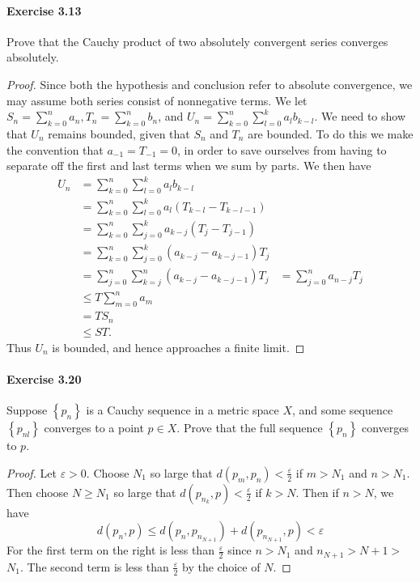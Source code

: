 \documentclass{article}
\theoremstyle{definition}
\begin{document}
\paragraph{Exercise 3.13} Prove that the Cauchy product of two absolutely convergent series converges absolutely.
\begin{proof}
    Since both the hypothesis and conclusion refer to absolute convergence, we may assume both series consist of nonnegative terms. We let $S_n=\sum_{k=0}^n a_n, T_n=\sum_{k=0}^n b_n$, and $U_n=\sum_{k=0}^n \sum_{l=0}^k a_l b_{k-l}$. We need to show that $U_n$ remains bounded, given that $S_n$ and $T_n$ are bounded. To do this we make the convention that $a_{-1}=T_{-1}=0$, in order to save ourselves from having to separate off the first and last terms when we sum by parts. We then have
$$
\begin{aligned}
U_n &=\sum_{k=0}^n \sum_{l=0}^k a_l b_{k-l} \\
&=\sum_{k=0}^n \sum_{l=0}^k a_l\left(T_{k-l}-T_{k-l-1}\right) \\
&=\sum_{k=0}^n \sum_{j=0}^k a_{k-j}\left(T_j-T_{j-1}\right) \\
&=\sum_{k=0}^n \sum_{j=0}^k\left(a_{k-j}-a_{k-j-1}\right) T_j \\
&=\sum_{j=0}^n \sum_{k=j}^n\left(a_{k-j}-a_{k-j-1}\right) T_j
&=\sum_{j=0}^n a_{n-j} T_j \\
&\leq T \sum_{m=0}^n a_m \\
&=T S_n \\
&\leq S T .
\end{aligned}
$$
Thus $U_n$ is bounded, and hence approaches a finite limit.

\end{proof}


\paragraph{Exercise 3.20} Suppose $\left\{p_{n}\right\}$ is a Cauchy sequence in a metric space $X$, and some sequence $\left\{p_{n l}\right\}$ converges to a point $p \in X$. Prove that the full sequence $\left\{p_{n}\right\}$ converges to $p$.
\begin{proof}
    Let $\varepsilon>0$. Choose $N_1$ so large that $d\left(p_m, p_n\right)<\frac{\varepsilon}{2}$ if $m>N_1$ and $n>N_1$. Then choose $N \geq N_1$ so large that $d\left(p_{n_k}, p\right)<\frac{\varepsilon}{2}$ if $k>N$. Then if $n>N$, we have
$$
d\left(p_n, p\right) \leq d\left(p_n, p_{n_{N+1}}\right)+d\left(p_{n_{N+1}}, p\right)<\varepsilon
$$
For the first term on the right is less than $\frac{\varepsilon}{2}$ since $n>N_1$ and $n_{N+1}>N+1>$ $N_1$. The second term is less than $\frac{\varepsilon}{2}$ by the choice of $N$.
\end{proof}
\end{document}
